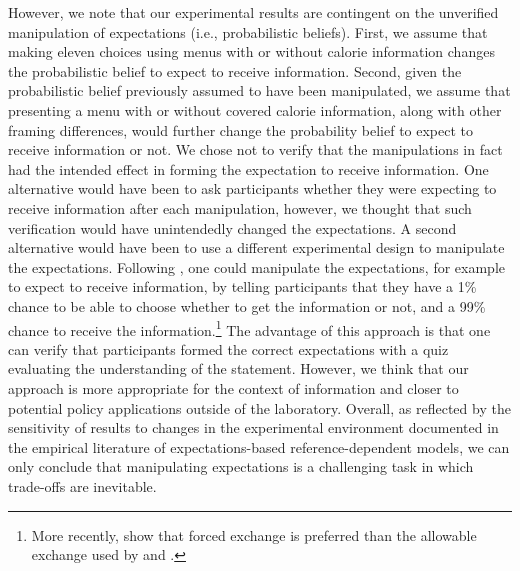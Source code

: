 However, we note that our experimental results are contingent on the unverified manipulation of expectations (i.e., probabilistic beliefs). First, we assume that making eleven choices using menus with or without calorie information changes the probabilistic belief to expect to receive information. Second, given the probabilistic belief previously assumed to have been manipulated, we assume that presenting a menu with or without covered calorie information, along with other framing differences, would further change the probability belief to expect to receive information or not. We chose not to verify that the manipulations in fact had the intended effect in forming the expectation to receive information. One alternative would have been to ask participants whether they were expecting to receive information after each manipulation, however, we thought that such verification would have unintendedly changed the expectations. A second alternative would have been to use a different experimental design to manipulate the expectations. Following \citet{marzilliericsonExpectationsEndowmentsEvidence2011} \citet{heffetzEndowmentEffectExpectations2014}, one could manipulate the expectations, for example to expect to receive information, by telling participants that they have a 1\% chance to be able to choose whether to get the information or not, and a 99\% chance to receive the information.\footnote{ More recently, \citet{cerulli-harmsRandomizingEndowmentsExperimental2019} show that forced exchange is preferred than the allowable exchange used by \citet{marzilliericsonExpectationsEndowmentsEvidence2011} and \citet{heffetzEndowmentEffectExpectations2014}.} The advantage of this approach is that one can verify that participants formed the correct expectations with a quiz evaluating the understanding of the statement. However, we think that our approach is more appropriate for the context of information and closer to potential policy applications outside of the laboratory. Overall, as reflected by the sensitivity of results to changes in the experimental environment documented in the empirical literature of expectations-based reference-dependent models, we can only conclude that manipulating expectations is a challenging task in which trade-offs are inevitable.

